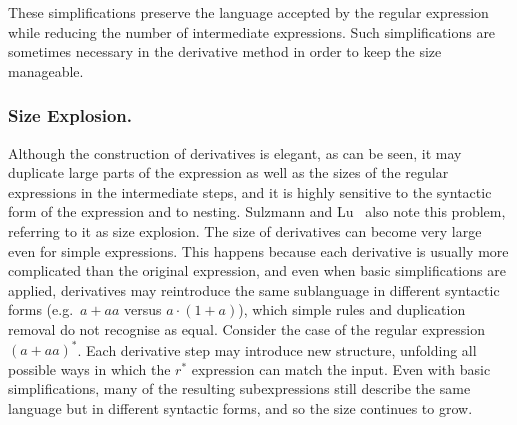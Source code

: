 \documentclass[12pt]{article}
\begin{document}
These simplifications preserve the language accepted by the regular expression
while reducing the number of intermediate expressions. Such simplifications are
sometimes necessary in the derivative method in order to keep the size
manageable.

\FloatBarrier
\subsubsection{Size Explosion.}  

Although the construction of derivatives is elegant, as can be seen, it may
duplicate large parts of the expression as well as the sizes of the regular
expressions in the intermediate steps, and it is highly sensitive to the
syntactic form of the expression and to nesting. Sulzmann and
Lu~\cite{Sulzmann2014} also note this problem, referring to it as size
explosion.
The size of derivatives can become very large even for simple expressions. 
This happens because each derivative is usually more complicated than the
original expression, and even when basic simplifications are applied,
derivatives may reintroduce the same sublanguage in different syntactic forms
(e.g.\ $a+aa$ versus $a \cdot (1+a)$), which simple rules and duplication
removal do not recognise as equal. Consider the case of the regular expression
$(a+aa)^*$. Each derivative step may introduce new structure, unfolding all
possible ways in which the $r^*$ expression can match the input. Even with
basic simplifications, many of the resulting subexpressions still describe the
same language but in different syntactic forms, and so the size continues to
grow.
\end{document}
